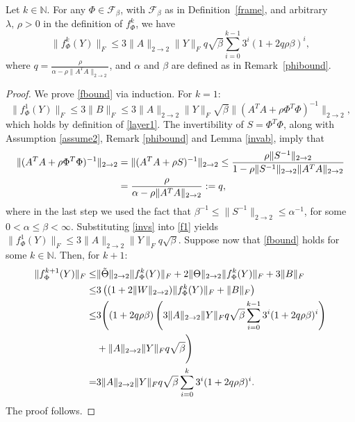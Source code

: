 \documentclass[10pt,a4paper]{amsart}
\newcommand{\opnorm}{2\rightarrow2}
\begin{document}
\begin{proposition}\label{boundedoutput}
    Let $k\in\mathbb{N}$. For any $\Phi\in\mathcal{F}_{\beta }$, with $\mathcal{F}_{\beta }$ as in Definition~\ref{frame}, and arbitrary $\lambda,\,\rho>0$ in the definition of $f_\Phi^k$, we have
    \begin{equation}\label{fbound}
        \|f_\Phi^k(Y)\|_F\leq3\|A\|_{\opnorm}\|Y\|_Fq\sqrt{\beta }\sum_{i=0}^{k-1}3^i(1+2q\rho\beta)^i,
    \end{equation}
where $q=\frac{\rho}{\alpha-\rho\|A^TA\|_{\opnorm}}$, and $\alpha$ and $\beta$ are defined as in Remark~\ref{phibound}.
\end{proposition}

\begin{proof}
    We prove \eqref{fbound} via induction. For $k=1$:
    \begin{equation}\label{f1}
        \|f_\Phi^1(Y)\|_F\leq3\|B\|_F\leq3\|A\|_{\opnorm}\|Y\|_F\sqrt{\beta }\|(A^TA+\rho\Phi^T\Phi)^{-1}\|_{\opnorm},
    \end{equation}
which holds by definition of \eqref{layer1}. The invertibility of $S=\Phi^T\Phi$, along with Assumption \ref{assume2}, Remark \ref{phibound} and Lemma \ref{invab}, imply that
\begin{align}
    \|(A^TA+\rho\Phi^T\Phi)^{-1}\|_{\opnorm}&=\|(A^TA+\rho S)^{-1}\|_{\opnorm}\leq\frac{\rho\|S^{-1}\|_{\opnorm}}{1-\rho\|S^{-1}\|_{\opnorm}\|A^TA\|_{\opnorm}}\notag\\ 
    \label{invs}
    &=\frac{\rho}{\alpha-\rho\|A^TA\|_{\opnorm}}:=q,
\end{align}
where in the last step we used the fact that $\beta^{-1}\leq\|S^{-1}\|_{\opnorm}\leq\alpha^{-1}$, for some $0<\alpha\leq\beta<\infty$. Substituting \eqref{invs} into \eqref{f1} yields $\|f_\Phi^1(Y)\|_F\leq3\|A\|_{\opnorm}\|Y\|_Fq\sqrt{\beta}$. Suppose now that \eqref{fbound} holds for some $k\in\mathbb{N}$. Then, for $k+1$:
\begin{align*}
    \|f_\Phi^{k+1}(Y)\|_F\leq&\|\Tilde{\Theta}\|_{\opnorm}\|f_\Phi^k(Y)\|_F+2\|\Theta\|_{\opnorm}\|f_\Phi^k(Y)\|_F+3\|B\|_F\\
    \leq&3\left((1+2\|W\|_{\opnorm})\|f_\Phi^k(Y)\|_F+\|B\|_F\right)\\
    \leq&3\Bigg((1+2q\rho\beta )\left(3\|A\|_{\opnorm}\|Y\|_Fq\sqrt{\beta}\sum_{i=0}^{k-1}3^i(1+2q\rho\beta )^i\right)\\
    &+\|A\|_{\opnorm}\|Y\|_Fq\sqrt{\beta}\Bigg)\\
    =&3\|A\|_{\opnorm}\|Y\|_Fq\sqrt{\beta}\sum_{i=0}^{k}3^i(1+2q\rho\beta )^i.
\end{align*}
The proof follows.
\end{proof}
\end{document}
